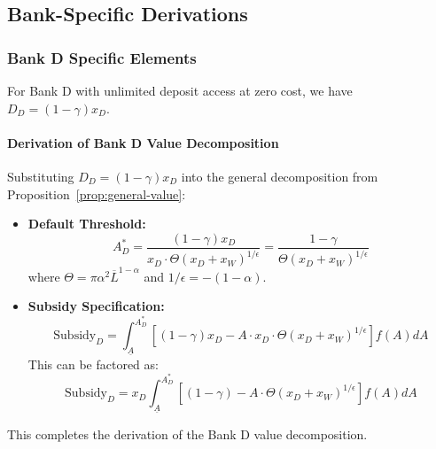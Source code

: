 \documentclass[12pt]{article}
\begin{document}
\subsection{Bank-Specific Derivations}
\subsubsection{Bank D Specific Elements}
For Bank D with unlimited deposit access at zero cost, we have $D_{D} = (1-\gamma)x_{D}$.

\paragraph{Derivation of Bank D Value Decomposition}
\label{app:deriv-D-value}
Substituting $D_{D} = (1-\gamma)x_{D}$ into the general decomposition from Proposition~\ref{prop:general-value}:
\begin{itemize}
    \item \textbf{Default Threshold:}
    \begin{equation}
    A_{D}^{*} = \frac{(1-\gamma)x_{D}}{x_{D} \cdot \Theta(x_{D}+x_{W})^{1/\epsilon}} = \frac{1-\gamma}{\Theta(x_{D}+x_{W})^{1/\epsilon}}
    \end{equation}
    where $\Theta=\pi\alpha^{2}\overline{L}^{1-\alpha}$ and $1/\epsilon = -(1-\alpha)$.
    \item \textbf{Subsidy Specification:}
    \begin{equation}
    \text{Subsidy}_{D} = \int_{\underline{A}}^{A_{D}^{*}}[(1-\gamma)x_{D} - A \cdot x_{D} \cdot \Theta(x_{D}+x_{W})^{1/\epsilon}]f(A)dA
    \end{equation}
    This can be factored as:
    \begin{equation}
    \text{Subsidy}_{D} = x_{D}\int_{\underline{A}}^{A_{D}^{*}}[(1-\gamma) - A \cdot \Theta(x_{D}+x_{W})^{1/\epsilon}]f(A)dA
    \end{equation}
\end{itemize}
This completes the derivation of the Bank D value decomposition.
\end{document}
